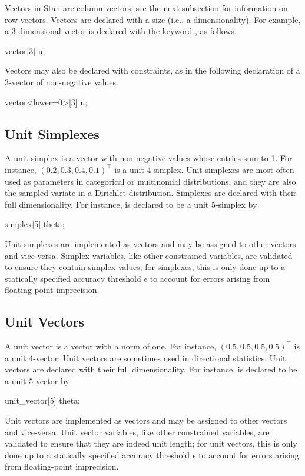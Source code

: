 Vectors in Stan are column vectors; see the next subsection for
information on row vectors.  Vectors are declared with a size (i.e., a
dimensionality).  For example, a 3-dimensional vector is declared with
the keyword , as follows.
%
\begin{stancode}
vector[3] u;
\end{stancode}
%
Vectors may also be declared with constraints, as in the following
declaration of a 3-vector of non-negative values.
%
\begin{stancode}
vector<lower=0>[3] u;
\end{stancode}
%




\subsection{Unit Simplexes}

A unit simplex is a vector with non-negative values whose entries sum
to 1.  For instance, $(0.2,0.3,0.4,0.1)^{\top}$ is a unit 4-simplex.
Unit simplexes are most often used as parameters in categorical
or multinomial distributions, and they are also the sampled variate in
a Dirichlet distribution.  Simplexes are declared with their full
dimensionality.  For instance,  is declared to
be a unit $5$-simplex by
%
\begin{stancode}
simplex[5] theta;
\end{stancode}
%

Unit simplexes are implemented as vectors and may be assigned to other
vectors and vice-versa.  Simplex variables, like other constrained
variables, are validated to ensure they contain simplex values; for
simplexes, this is only done up to a statically specified accuracy
threshold $\epsilon$ to account for errors arising from floating-point
imprecision.

\subsection{Unit Vectors}

A unit vector is a vector with a norm of one.  For instance,
$(0.5,0.5,0.5,0.5)^{\top}$ is a unit 4-vector.
Unit vectors are sometimes used in directional statistics.
Unit vectors are declared with their full
dimensionality.  For instance,  is declared to
be a unit $5$-vector by
%
\begin{stancode}
unit_vector[5] theta;
\end{stancode}
%
Unit vectors are implemented as vectors and may be assigned to other
vectors and vice-versa.  Unit vector variables, like other constrained
variables, are validated to ensure that they are indeed unit length; for
unit vectors, this is only done up to a statically specified accuracy
threshold $\epsilon$ to account for errors arising from floating-point
imprecision.

